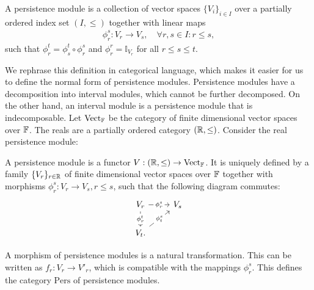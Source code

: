 \begin{definition}{\cite[\S 1.1]{chazal2016structure}}
A persistence module is a collection of vector spaces $\{V_i\}_{i \in I}$ over a partially ordered index set $(I,\leq)$ together with linear maps
\begin{align}
\phi_{r}^{s}: V_r \rightarrow V_s, \quad \forall r,s \in I: r \leq s,
\end{align}
such that $\phi_{r}^{t} = \phi^{t}_{s} \circ \phi_{r}^{s}$ and $\phi_{r}^r = \mathbb{I}_{V_r}$ for all $r \leq s \leq t$.
\end{definition}

We rephrase this definition in categorical language, which makes it easier for us to define the normal form of persistence modules. Persistence modules have a decomposition into interval modules, which cannot be further decomposed. On the other hand, an interval module is a persistence module that is indecomposable. Let $\operatorname{Vect}_{\mathbb{F}}$ be the category of finite dimensional vector spaces over ${\mathbb{F}}$. The reals are a partially ordered category $({\mathbb{R}}, \leq)$. Consider the real persistence module:

\begin{definition}{\cite[\S 1.3]{chazal2016structure}}
A persistence module is a functor $V: ({\mathbb{R}},\leq) \rightarrow \operatorname{Vect}_{\mathbb{F}}$. It is uniquely defined by a family $\{V_r\}_{r\in{\mathbb{R}}}$ of finite dimensional vector spaces over ${\mathbb{F}}$ together with morphisms $\phi_{r}^{s}: V_r \rightarrow V_s, r \leq s$, such that the following diagram commutes:
\begin{equation}
\begin{tikzcd}
V_r \arrow[d, "{\phi_{r}^{t}}" description] \arrow[r, "{\phi_{r}^{s}}" description] & V_s \\
V_t. \arrow[ru, "{\phi_{t}^{s}}" description]                                      &    
\end{tikzcd}
\end{equation}
\end{definition}

\begin{remark}
A morphism of persistence modules is a natural transformation. This can be written as $f_r: V_r \rightarrow V'_r$, which is compatible with the mappings $\phi_{r}^{s}$. This defines the category $\mathrm{Pers}$ of persistence modules.
\end{remark}

